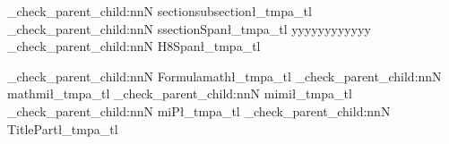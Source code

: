 \documentclass{article}
\begin{document}


\tag_check_parent_child:nnN {section}{subsection}\l_tmpa_tl
\tag_check_parent_child:nnN {ssection}{Span}\l_tmpa_tl
yyyyyyyyyyyy
\tag_check_parent_child:nnN {H8}{Span}\l_tmpa_tl

\tag_check_parent_child:nnN {Formula}{math}\l_tmpa_tl
\tag_check_parent_child:nnN {math}{mi}\l_tmpa_tl
\tag_check_parent_child:nnN {mi}{mi}\l_tmpa_tl
\tag_check_parent_child:nnN {mi}{P}\l_tmpa_tl
\tag_check_parent_child:nnN {Title}{Part}\l_tmpa_tl

\tagstructend
\ExplSyntaxOff
\end{document}
